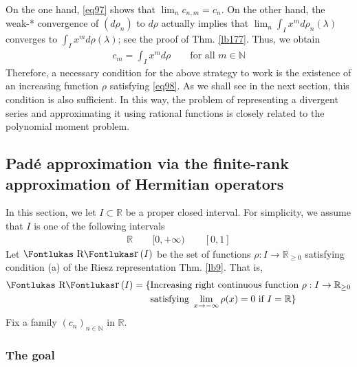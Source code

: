 \documentclass[12pt,b5paper,notitlepage]{article}
\theoremstyle{definition}
\theoremstyle{plain}
\DeclareMathOperator{\Rr}{\text{\Fontlukas R}\text{\kern -0pt {\Fontlukas\large r}}\,}
\newcommand{\Nbb}{\mathbb N}
\newcommand{\Rbb}{\mathbb R}
\numberwithin{equation}{section}
\begin{document}
On the one hand, \eqref{eq97} shows that $\lim_n c_{n,m}=c_n$. On the other hand, the weak-* convergence of $(d\rho_n)$ to $d\rho$ actually implies that $\lim_n\int_I x^m d\rho_n(\lambda)$ converges to $\int_I x^m d\rho(\lambda)$; see the proof of Thm. \ref{lb177}. Thus, we obtain
\begin{align}\label{eq98}
c_m=\int_I x^md\rho\qquad\text{for all }m\in\Nbb
\end{align}
Therefore, a necessary condition for the above strategy to work is the existence of an increasing function $\rho$ satisfying \eqref{eq98}. As we shall see in the next section, this condition is also sufficient. In this way, the problem of representing a divergent series and approximating it using rational functions is closely related to the polynomial moment problem.








\subsection{Pad\'e approximation via the finite-rank approximation of Hermitian operators}\label{lb188}



In this section, we let $I\subset\Rbb$ be a proper closed interval. For simplicity, we assume that $I$ is one of the following intervals
\begin{align*}
\Rbb\qquad [0,+\infty)\qquad [0,1]
\end{align*} 
Let $\Rr(I)$ \index{Rr@$\Rr(I)$} be the set of functions $\rho:I\rightarrow\Rbb_{\geq0}$ satisfying condition (a) of the Riesz representation Thm. \ref{lb9}. That is,
\begin{align}\label{eq100}
\begin{aligned}
\Rr(I)=\{&\text{Increasing right continuous function }\rho:I\rightarrow\Rbb_{\geq0}\\
&\text{satisfying }\lim_{x\rightarrow-\infty}\rho(x)=0\text{ if }I=\Rbb\}
\end{aligned}
\end{align}
Fix a family $(c_n)_{n\in\Nbb}$ in $\Rbb$. 

\subsubsection{The goal}
\end{document}
